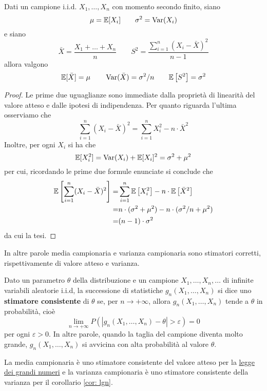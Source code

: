 \begin{proposition}
	Dati un campione i.i.d. $X_1, \dots, X_n$ con momento secondo finito, siano
	\[ \mu = \mathbb{E}[X_i] \quad \quad \sigma^2 = \operatorname{Var}(X_i) \]
	e siano
	\[ \bar{X} = \frac{X_1 + \dots + X_n}{n} \quad \quad
		S^2 = \dfrac{\sum_{i=1}^n (X_i - \bar{X})^2}{n-1}
	\]
	allora valgono
	\[
		\mathbb{E}[\bar{X}] = \mu \quad \quad
		\operatorname{Var}(\bar{X}) = \sigma^2 / n \quad \quad
		\mathbb{E} \left[ S^2 \right] = \sigma^2
	\]
	\begin{proof}
		Le prime due uguaglianze sono immediate dalla proprietà di linearità del valore atteso e
		dalle ipotesi di indipendenza. Per quanto riguarda l'ultima osserviamo che
		\[ \sum_{i=1}^n (X_i - \bar{X})^2 = \sum_{i=1}^n X_i^2 - n \cdot \bar{X}^2 \]
		Inoltre, per ogni $X_i$ si ha che
		\[ \mathbb{E}[X_i^2] = \operatorname{Var}(X_i) + \mathbb{E}[X_i]^2 = \sigma^2 + \mu^2 \]
		per cui, ricordando le prime due formule enunciate si conclude che
		\begin{align*}
			\mathbb{E} \left[ \sum_{i=1}^n (X_i - \bar{X})^2 \right]
			= & \sum_{i=1}^n \mathbb{E} \left[ X_i^2 \right] - n \cdot \mathbb{E} \left[ \bar{X}^2 \right] \\
			= & n \cdot (\sigma^2 + \mu^2) - n \cdot (\sigma^2 / n + \mu^2)                \\
			= & (n-1) \cdot \sigma^2
		\end{align*}
		da cui la tesi.
	\end{proof}
\end{proposition}

In altre parole media campionaria e varianza campionaria sono stimatori corretti,
rispettivamente di valore atteso e varianza.

\begin{definition}\label{def: stimatore consistente}
	Dato un parametro $\theta$ della distribuzione e un campione $X_1, \dots, X_n, \dots$ di
	infinite variabili aleatorie i.i.d, la successione di statistiche $g_n(X_1, \dots, X_n)$ si
	dice uno \textbf{stimatore consistente} di $\theta$ se, per $n \to +\infty$, allora
	$g_n(X_1, \dots, X_n)$ tende a $\theta$ in probabilità, cioè
	\[ \lim_{n \to +\infty} P(|g_n(X_1, \dots, X_n) - \theta| > \varepsilon) = 0 \]
	per ogni $\varepsilon > 0$. In altre parole, quando la taglia del campione diventa molto
	grande, $g_n(X_1, \dots, X_n)$ si avvicina con alta probabilità al valore $\theta$.
\end{definition}

La media campionaria è uno stimatore consistente del valore atteso per la
\hyperref[th: lgn]{legge dei grandi numeri} e la varianza campionaria è uno stimatore consistente
della varianza per il corollario \ref{cor: lgn}.

